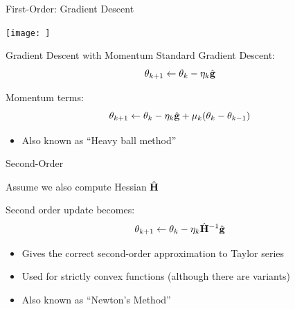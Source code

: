 \documentclass{beamer}
\begin{document}
\begin{frame}{First-Order: Gradient Descent}
  \begin{figure}
    \begin{algorithmic}
      \EndFor{}
      \EndWhile{}
      \State{\Return{$\theta$}}
    \end{algorithmic}
  \end{figure}  
\end{frame}

\begin{frame}{}
  \texttt{[image: ]}
\end{frame}

\begin{frame}{Gradient Descent with Momentum}
  Standard Gradient Descent:
  \[\theta_{k+1} \gets \theta_{k} - \eta_k \hat{\mathbf{g}}\]

  Momentum terms:
  \[\theta_{k+1} \gets \theta_{k} - \eta_k \hat{\mathbf{g}} + \mu_k(\theta_{k} - \theta_{k-1}) \]

  \begin{itemize}
  \item Also known as ``Heavy ball method''
  \end{itemize}
\end{frame}

\begin{frame}{Second-Order}

  Assume we also compute Hessian $\hat{\mathbf{H}}$ 

   Second order update becomes:
  \[\theta_{k+1} \gets \theta_{k} - \eta_k \hat{\mathbf{H}}^{-1} \hat{\mathbf{g}} \]

  \begin{itemize}
  \item Gives the correct second-order approximation to Taylor series
  \item Used for strictly convex functions (although there are variants)
  \item Also known as ``Newton's Method''
  \end{itemize}

\end{frame}
\end{document}
